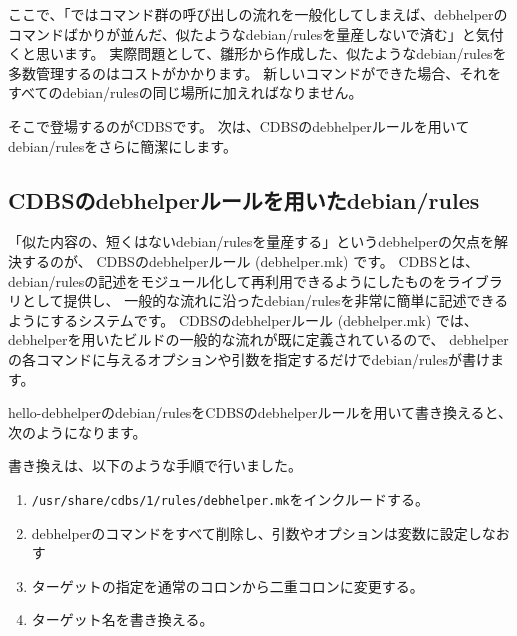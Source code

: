 \documentclass[mingoth,a4paper]{jsarticle}
\begin{document}
ここで、「ではコマンド群の呼び出しの流れを一般化してしまえば、debhelperのコマンドばかりが並んだ、似たようなdebian/rulesを量産しないで済む」と気付くと思います。
実際問題として、雛形から作成した、似たようなdebian/rulesを多数管理するのはコストがかかります。
新しいコマンドができた場合、それをすべてのdebian/rulesの同じ場所に加えればなりません。

そこで登場するのがCDBSです。
次は、CDBSのdebhelperルールを用いてdebian/rulesをさらに簡潔にします。

\subsection{CDBSのdebhelperルールを用いたdebian/rules}

「似た内容の、短くはないdebian/rulesを量産する」というdebhelperの欠点を解決するのが、
CDBSのdebhelperルール (debhelper.mk) です。
CDBSとは、
debian/rulesの記述をモジュール化して再利用できるようにしたものをライブラリとして提供し、
一般的な流れに沿ったdebian/rulesを非常に簡単に記述できるようにするシステムです。
CDBSのdebhelperルール (debhelper.mk) では、
debhelperを用いたビルドの一般的な流れが既に定義されているので、
debhelperの各コマンドに与えるオプションや引数を指定するだけでdebian/rulesが書けます。

hello-debhelperのdebian/rulesをCDBSのdebhelperルールを用いて書き換えると、
次のようになります。


書き換えは、以下のような手順で行いました。

\begin{enumerate}
 \item \texttt{/usr/share/cdbs/1/rules/debhelper.mk}をインクルードする。
 \item debhelperのコマンドをすべて削除し、引数やオプションは変数に設定しなおす
 \item ターゲットの指定を通常のコロンから二重コロンに変更する。
 \item ターゲット名を書き換える。
\end{enumerate}
\end{document}
